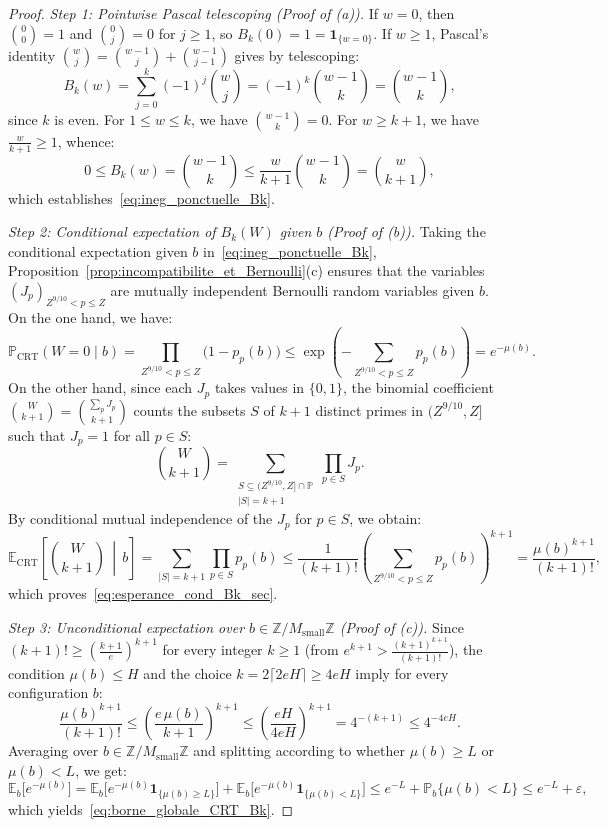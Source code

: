 \documentclass[11pt, a4paper]{article}
\theoremstyle{plain}
\theoremstyle{definition}
\newcommand{\Z}{\mathbb{Z}}
\newcommand{\Pbb}{\mathbb{P}}
\newcommand{\Ebb}{\mathbb{E}}
\newcommand{\ind}{\mathbf{1}}
\begin{document}
\begin{proof}
\emph{Step 1: Pointwise Pascal telescoping (Proof of (a)).}
If $w = 0$, then $\binom{0}{0} = 1$ and $\binom{0}{j} = 0$ for $j \ge 1$, so $B_k(0) = 1 = \ind_{\{w=0\}}$. If $w \ge 1$, Pascal's identity $\binom{w}{j} = \binom{w-1}{j} + \binom{w-1}{j-1}$ gives by telescoping:
\[
B_k(w) = \sum_{j=0}^k (-1)^j \binom{w}{j} = (-1)^k \binom{w-1}{k} = \binom{w-1}{k},
\]
since $k$ is even. For $1 \le w \le k$, we have $\binom{w-1}{k} = 0$. For $w \ge k+1$, we have $\frac{w}{k+1} \ge 1$, whence:
\[
0 \le B_k(w) = \binom{w-1}{k} \le \frac{w}{k+1}\binom{w-1}{k} = \binom{w}{k+1},
\]
which establishes~\eqref{eq:ineg_ponctuelle_Bk}.

\medskip\noindent\emph{Step 2: Conditional expectation of $B_k(W)$ given $b$ (Proof of (b)).}
Taking the conditional expectation given $b$ in~\eqref{eq:ineg_ponctuelle_Bk}, Proposition~\ref{prop:incompatibilite_et_Bernoulli}(c) ensures that the variables $(J_p)_{Z^{9/10} < p \le Z}$ are mutually independent Bernoulli random variables given $b$. On the one hand, we have:
\[
\Pbb_{\mathrm{CRT}}(W = 0 \mid b) = \prod_{Z^{9/10} < p \le Z} \big(1 - p_p(b)\big) \le \exp\!\left( -\sum_{Z^{9/10} < p \le Z} p_p(b) \right) = e^{-\mu(b)}.
\]
On the other hand, since each $J_p$ takes values in $\{0, 1\}$, the binomial coefficient $\binom{W}{k+1} = \binom{\sum_p J_p}{k+1}$ counts the subsets $S$ of $k+1$ distinct primes in $(Z^{9/10}, Z]$ such that $J_p = 1$ for all $p \in S$:
\[
\binom{W}{k+1} = \sum_{\substack{S \subseteq (Z^{9/10}, Z] \cap \mathbb{P} \\ |S| = k+1}} \prod_{p \in S} J_p.
\]
By conditional mutual independence of the $J_p$ for $p \in S$, we obtain:
\[
\Ebb_{\mathrm{CRT}}\!\left[\binom{W}{k+1} \,\middle|\, b\right] = \sum_{|S| = k+1} \prod_{p \in S} p_p(b) \le \frac{1}{(k+1)!} \left(\sum_{Z^{9/10} < p \le Z} p_p(b)\right)^{k+1} = \frac{\mu(b)^{k+1}}{(k+1)!},
\]
which proves~\eqref{eq:esperance_cond_Bk_sec}.

\medskip\noindent\emph{Step 3: Unconditional expectation over $b \in \Z / M_{\mathrm{small}} \Z$ (Proof of (c)).}
Since $(k+1)! \ge \left(\frac{k+1}{e}\right)^{k+1}$ for every integer $k \ge 1$ (from $e^{k+1} > \frac{(k+1)^{k+1}}{(k+1)!}$), the condition $\mu(b) \le H$ and the choice $k = 2\lceil 2eH \rceil \ge 4eH$ imply for every configuration $b$:
\[
\frac{\mu(b)^{k+1}}{(k+1)!} \le \left(\frac{e\,\mu(b)}{k+1}\right)^{k+1} \le \left(\frac{eH}{4eH}\right)^{k+1} = 4^{-(k+1)} \le 4^{-4eH}.
\]
Averaging over $b \in \Z / M_{\mathrm{small}} \Z$ and splitting according to whether $\mu(b) \ge L$ or $\mu(b) < L$, we get:
\[
\Ebb_b\big[e^{-\mu(b)}\big] = \Ebb_b\big[e^{-\mu(b)}\ind_{\{\mu(b) \ge L\}}\big] + \Ebb_b\big[e^{-\mu(b)}\ind_{\{\mu(b) < L\}}\big] \le e^{-L} + \Pbb_b\big\{\mu(b) < L\big\} \le e^{-L} + \varepsilon,
\]
which yields~\eqref{eq:borne_globale_CRT_Bk}.
\end{proof}
\end{document}
